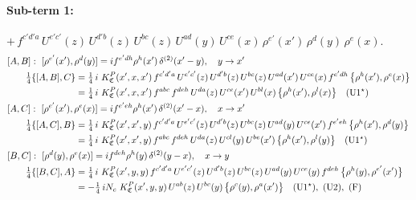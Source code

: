 \documentclass[10pt]{article}
\numberwithin{equation}{section}
\begin{document}
\paragraph{Sub-term 1:} $+\,f^{c'd'a}\,U^{e'c'}(z)\,U^{d'b}(z)\,U^{bc}(z)\,U^{ad}(y)\,U^{ce}(x)\,\rho^{e'}(x')\,\rho^{d}(y)\,\rho^{e}(x)$.
\begin{align}
&[A,B]:\ [\rho^{e'}(x'),\rho^{d}(y)]=i f^{e'dh}\rho^{h}(x')\,\delta^{(2)}(x'-y),\quad y\to x'\notag\\
&\qquad \tfrac14\{[A,B],C\}=\tfrac14\,i\,\,K^{P}_{\mathfrak C}(x',x,x')\,f^{c'd'a}\,U^{e'c'}(z)\,U^{d'b}(z)\,U^{bc}(z)\,U^{ad}(x')\,U^{ce}(x)\,f^{e'dh}\,\big\{\rho^{h}(x'),\rho^{e}(x)\big\}\notag\\
&\qquad\phantom{\tfrac14\{[A,B],C\}}=\tfrac14\,i\,\,K^{P}_{\mathfrak C}(x',x,x')\,f^{abc}\,f^{deh}\,U^{da}(z)\,U^{ce}(x')\,U^{bl}(x)\,\big\{\rho^{h}(x'),\rho^{l}(x)\big\}\quad\text{(U1$^\star$)}
\label{B:eq:GIII.VI.P-1-AB}\\
&[A,C]:\ [\rho^{e'}(x'),\rho^{e}(x)]=i f^{e'eh}\rho^{h}(x')\,\delta^{(2)}(x'-x),\quad x\to x'\notag\\
&\qquad \tfrac14\{[A,C],B\}=\tfrac14\,i\,\,K^{P}_{\mathfrak C}(x',x',y)\,f^{c'd'a}\,U^{e'c'}(z)\,U^{d'b}(z)\,U^{bc}(z)\,U^{ad}(y)\,U^{ce}(x')\,f^{e'eh}\,\big\{\rho^{h}(x'),\rho^{d}(y)\big\}\notag\\
&\qquad\phantom{\tfrac14\{[A,C],B\}}=\tfrac14\,i\,\,K^{P}_{\mathfrak C}(x',x',y)\,f^{abc}\,f^{deh}\,U^{da}(z)\,U^{cl}(y)\,U^{be}(x')\,\big\{\rho^{h}(x'),\rho^{l}(y)\big\}\quad\text{(U1$^\star$)}
\label{B:eq:GIII.VI.P-1-AC}\\
&[B,C]:\ [\rho^{d}(y),\rho^{e}(x)]=i f^{deh}\rho^{h}(y)\,\delta^{(2)}(y-x),\quad x\to y\notag\\
&\qquad \tfrac14\{[B,C],A\}=\tfrac14\,i\,\,K^{P}_{\mathfrak C}(x',y,y)\,f^{c'd'a}\,U^{e'c'}(z)\,U^{d'b}(z)\,U^{bc}(z)\,U^{ad}(y)\,U^{ce}(y)\,f^{deh}\,\big\{\rho^{h}(y),\rho^{e'}(x')\big\}\notag\\
&\qquad\phantom{\tfrac14\{[B,C],A\}}=-\tfrac14\,i N_{c}\,\,K^{P}_{\mathfrak C}(x',y,y)\,U^{ab}(z)\,U^{bc}(y)\,\big\{\rho^{c}(y),\rho^{a}(x')\big\}\quad\text{(U1$^\star$)},\ \text{(U2)},\ \text{(F)}
\label{B:eq:GIII.VI.P-1-BC}
\end{align}
\end{document}
